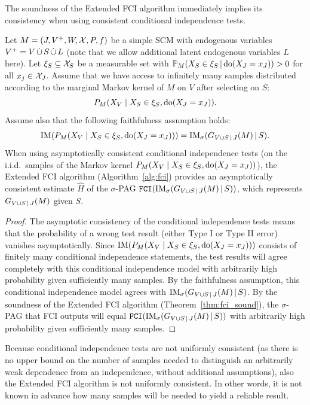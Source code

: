 The soundness of the Extended FCI algorithm immediately implies its consistency when using consistent conditional independence tests.
\begin{Cor}\label{cor:fci_consistent}
  Let $M = \left ( J, V^+, W, \mathcal{X}, P, f \right )$ be a simple SCM with endogenous variables $V^+ = V \,\dot{\cup}\, S \,\dot{\cup}\, L$ (note that we allow additional latent endogenous variables $L$ here).
  Let $\xi_S \subseteq \mathcal{X}_S$ be a measurable set with $\mathbb{P}_M(X_S \in \xi_S \operatorname*{|} \operatorname{do}(X_J = x_J)) > 0$ for all $x_j \in \mathcal{X}_J$.
  Assume that we have access to infinitely many samples distributed according to the marginal Markov kernel of $M$ on $V$ after selecting on $S$:
    $$P_M(X_V \mid X_S \in \xi_S, \operatorname{do}(X_J=x_J)).$$
  Assume also that the following faithfulness assumption holds:
    $$\mathrm{IM}(P_{M}(X_V \mid X_S \in \xi_S, \operatorname{do}(X_J=x_J))) = \mathrm{IM}_\sigma(G_{V \cup S \operatorname*{|} J}(M) \operatorname*{|} S).$$
  When using asymptotically consistent conditional independence tests (on the i.i.d.\ samples of the Markov kernel $P_M(X_V \mid X_S \in \xi_S, \operatorname{do}(X_J=x_J))$), 
  the Extended FCI algorithm (Algorithm~\ref{alg:fci}) provides an asymptotically consistent estimate $\hat{H}$ of the $\sigma$-PAG $\mathtt{FCI}(\mathrm{IM}_\sigma(G_{V \cup S \operatorname*{|} J}(M) \operatorname*{|} S))$, which represents $G_{V \cup S \operatorname*{|} J}(M)$ given $S$.
\end{Cor}
\begin{proof}
  The asymptotic consistency of the conditional independence tests means that the probability of a wrong test result (either Type I or Type II error) vanishes asymptotically.
  Since $\mathrm{IM}(P_{M}(X_V \mid X_S \in \xi_S, \operatorname{do}(X_J=x_J)))$ consists of finitely many conditional independence statements, the test results will agree completely with this conditional independence model with arbitrarily high probability given sufficiently many samples.
  By the faithfulness assumption, this conditional independence model agrees with $\mathrm{IM}_\sigma(G_{V \cup S \operatorname*{|} J}(M) \operatorname*{|} S)$.
  By the soundness of the Extended FCI algorithm (Theorem~\ref{thm:fci_sound}), the $\sigma$-PAG that FCI outputs will equal $\mathtt{FCI}(\mathrm{IM}_\sigma(G_{V \cup S \operatorname*{|} J}(M) \operatorname*{|} S))$ with arbitrarily high probability given sufficiently many samples.
\end{proof}
Because conditional independence tests are not uniformly consistent (as there is no upper bound on the number of samples needed to distinguish an arbitrarily weak dependence from an independence, without additional assumptions), also the Extended FCI algorithm is not uniformly consistent. 
In other words, it is not known in advance how many samples will be needed to yield a reliable result.


